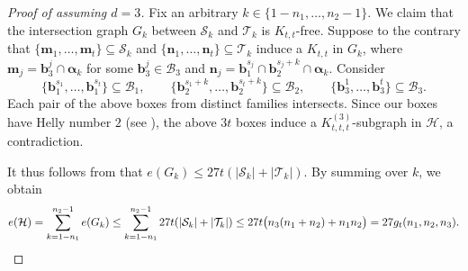 \documentclass[11pt]{article}
\theoremstyle{definition}
\newcommand*{\cH}{\mathcal{H}}
\newcommand*{\cB}{\mathcal{B}}
\newcommand*{\cS}{\mathcal{S}}
\newcommand*{\cT}{\mathcal{T}}
\begin{document}
\begin{proof}[Proof of  assuming $d = 3$]
    Fix an arbitrary $k \in \{1 - n_1, \dots, n_2 - 1\}$. We claim that the intersection graph $G_k$ between $\cS_k$ and $\cT_k$ is $K_{t, t}$-free. Suppose to the contrary that $\{\bm{m}_1, \dots, \bm{m}_t\} \subseteq \cS_k$ and $\{\bm{n}_1, \dots, \bm{n}_t\} \subseteq \cT_k$ induce a $K_{t, t}$ in $G_k$, where $\bm{m}_j = \bm{b}_3^j \cap \bm{\alpha}_k$ for some $\bm{b}_3^j \in \cB_3$ and $\bm{n}_j = \bm{b}_1^{s_j} \cap \bm{b}_2^{s_j+k} \cap \bm{\alpha}_k$. Consider
    \[
    \bigl\{ \bm{b}_1^{s_1}, \dots, \bm{b}_1^{s_t} \bigr\} \subseteq \cB_1, \qquad \bigl\{ \bm{b}_2^{s_1+k}, \dots, \bm{b}_2^{s_t+k} \bigr\} \subseteq \cB_2, \qquad \bigl\{ \bm{b}_3^1, \dots, \bm{b}_3^t \bigr\} \subseteq \cB_3. 
    \]
    Each pair of the above boxes from distinct families intersects. Since our boxes have Helly number $2$ (see ), the above $3t$ boxes induce a $K_{t, t, t}^{(3)}$-subgraph in $\cH$, a contradiction. 
    
    It thus follows from  that $e(G_k) \le 27t(|\cS_k| + |\cT_k|)$. By summing over $k$, we obtain
    \[
    e(\cH) = \sum_{k=1-n_1}^{n_2-1} e(G_k) \le \sum_{k=1-n_1}^{n_2-1} 27t(|\cS_k| + |\cT_k|) \le 27t \bigl( n_3(n_1+n_2) + n_1n_2 \bigr) = 27g_t(n_1, n_2, n_3). \qedhere
    \]
\end{proof}
\end{document}
